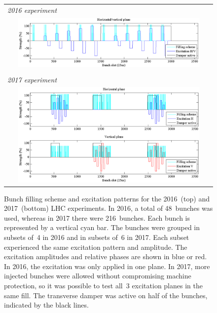 \documentclass[aps
,prstab
,reprint
,longbibliography
,preprintnumbers
,showkeys
,amsfonts,amssymb,amsmath
,floatfix
]{revtex4-1}
\begin{document}
\begin{figure}
  \begin{tabular}{c}
    \multicolumn{1}{l}{\emph{2016 experiment}} \\
    \includegraphics[width=0.9\textwidth]{bunchfilling_2016.png} \\
    \\
    \multicolumn{1}{l}{\emph{2017 experiment}} \\
    \includegraphics[width=0.9\textwidth]{bunchfilling_2017.png}
  \end{tabular}
  \caption{Bunch filling scheme and excitation patterns for the
    2016~(top) and 2017~(bottom) LHC experiments. In 2016, a total of
    48~bunches was used, whereas in 2017 there were 216~bunches. Each
    bunch is represented by a vertical cyan bar. The bunches were
    grouped in subsets of~4 in 2016 and in subsets of~6 in 2017. Each
    subset experienced the same excitation pattern and amplitude. The
    excitation amplitudes and relative phases are shown in blue or
    red. In 2016, the excitation was only applied in one plane. In
    2017, more injected bunches were allowed without compromising
    machine protection, so it was possible to test all~3 excitation
    planes in the same fill. The transverse damper was active on half
    of the bunches, indicated by the black lines.}
  \label{fig:fill}
\end{figure}
\end{document}
